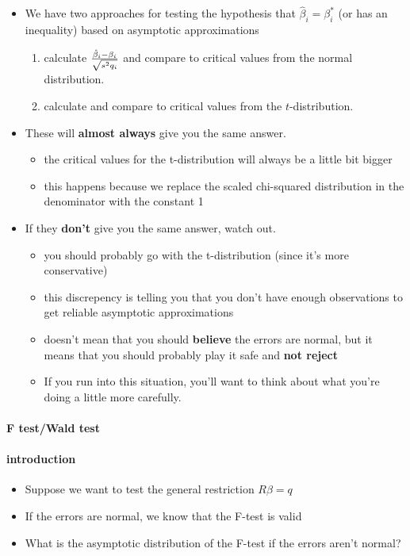 \begin{itemize}
\item We have two approaches for testing the hypothesis that
         $\hat\beta_i = \beta_i^*$ (or has an inequality) based on
         asymptotic approximations
\begin{enumerate}
\item calculate ${\hat\beta_i - \beta_i \over \sqrt{s^2 q_i}}$
            and compare to critical values from the normal distribution.
\item calculate and compare to critical values from the
            $t$-distribution.
\end{enumerate}
\item These will \textbf{almost always} give you the same answer.
\begin{itemize}
\item the critical values for the t-distribution will always be a
           little bit bigger
\item this happens because we replace the scaled chi-squared
           distribution in the denominator with the constant 1
\end{itemize}
\item If they \textbf{don't} give you the same answer, watch out.
\begin{itemize}
\item you should probably go with the t-distribution (since it's
           more conservative)
\item this discrepency is telling you that you don't have enough
           observations to get reliable asymptotic approximations
\item doesn't mean that you should \textbf{believe} the errors are
           normal, but it means that you should probably play it safe
           and \textbf{not reject}
\item If you run into this situation, you'll want to think about
           what you're doing a little more carefully.
\end{itemize}
\end{itemize}
\paragraph{F test/Wald test}
\label{sec-3-1-2}
\paragraph{introduction}
\label{sec-3-1-2-1}

\begin{itemize}
\item Suppose we want to test the general restriction $R\beta = q$
\item If the errors are normal, we know that the F-test is valid
\item What is the asymptotic distribution of the F-test if the
         errors aren't normal?
\end{itemize}
